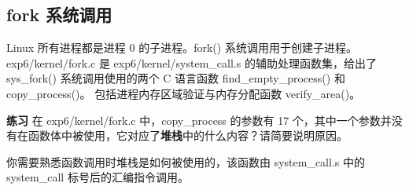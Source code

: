 \subsection{fork 系统调用}

Linux 所有进程都是进程 0 的子进程。fork() 系统调用用于创建子进程。exp6/kernel/fork.c 是 exp6/kernel/system\_call.s 的辅助处理函数集，给出了 sys\_fork() 系统调用使用的两个 C 语言函数 find\_empty\_process() 和 copy\_process()。 包括进程内存区域验证与内存分配函数 verify\_area()。

\begin{mdframed}[hidealllines=true,backgroundcolor=gray!20]
\textbf{练习 }在 exp6/kernel/fork.c 中，copy\_process 的参数有 17 个，其中一个参数并没有在函数体中被使用，它对应了\textbf{堆栈}中的什么内容？请简要说明原因。

你需要熟悉函数调用时堆栈是如何被使用的，该函数由 system\_call.s 中的 system\_call 标号后的汇编指令调用。
\end{mdframed}



